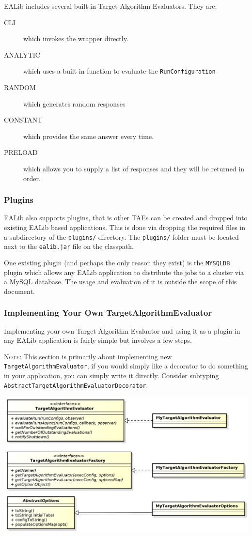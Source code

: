 \documentclass[11pt,letterpaper,oneside]{article}
\begin{document}
EALib includes several built-in Target Algorithm Evaluators. They are:

\begin{description}
\item[CLI] which invokes the wrapper directly.
\item[ANALYTIC] which uses a built in function to evaluate the \texttt{RunConfiguration}
\item[RANDOM] which generates random responses
\item[CONSTANT] which provides the same answer every time.
\item[PRELOAD] which allows you to supply a list of responses and they will be returned in order.
\end{description}

\subsubsection{Plugins}

EALib also supports plugins, that is other TAEs can be created and dropped into existing EALib based applications. This is done via dropping the required files in a subdirectory of the \texttt{plugins/} directory. The \texttt{plugins/} folder must be located next to the \texttt{ealib.jar} file on the classpath.

One existing plugin (and perhaps the only reason they exist) is the \texttt{MYSQLDB} plugin which allows any EALib application to distribute the jobs to a cluster via a MySQL database. The usage and evaluation of it is outside the scope of this document.

\subsubsection{Implementing Your Own TargetAlgorithmEvaluator}

Implementing your own Target Algorithm Evaluator and using it as a plugin in any EALib application is fairly simple but involves a few steps.

\textsc{Note}: This section is primarily about implementing new \texttt{TargetAlgorithmEvaluator}, if you would simply like a decorator to do something in your application, you can simply write it directly. Consider subtyping \texttt{AbstractTargetAlgorithmEvaluatorDecorator}.


\begin{center}
\includegraphics[scale=0.50]{img/UML/TAEFactory.png}
\end{center}
\end{document}
